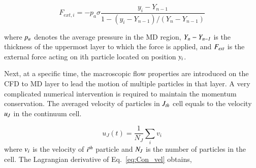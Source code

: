 \documentclass[preprint,12pt]{elsarticle}
\begin{document}
\vspace{-.2em}
\begin{equation}
 F_{ext, i} = -p_{a}\sigma\frac{y_{i}-Y_{n-1}}{1-(y_{i}-Y_{n-1})/(Y_{n}-Y_{n-1})}
 \label{eq:External_Force}
\end{equation}
\normalsize

where  $\it p_{a}$ denotes the average pressure in the MD region, $\it Y_{n}-Y_{n-1}$ is the thickness of the uppermost layer to which the force is applied, and $\it F_{ext}$ is the external force acting on ith particle located on position $\it y_{i}$.


Next, at a specific time, the macroscopic flow properties are introduced on the CFD to MD layer to lead the motion of multiple particles in that layer. A very complicated numerical intervention is required to maintain the momentum conservation. The averaged velocity of particles in $\it J_{th}$ cell equals to the velocity $\it u_{J}$ in the continuum cell.



\vspace{-.2em}
\begin{equation}
 u_{J}(t) = \frac{1}{N_{J}} \displaystyle\sum_{i} v_{i}
 \label{eq:Con_vel}
\end{equation}
\normalsize
where $\it v_{i}$ is the velocity of $\it i^{th}$ particle and $\it N_{J}$ is the number of particles in the cell. The Lagrangian derivative of Eq.~\ref{eq:Con_vel} obtains,
\end{document}
